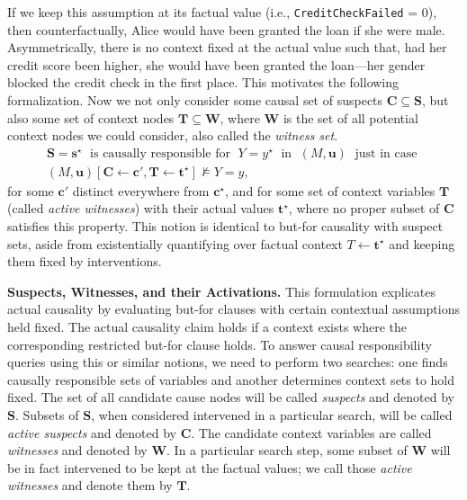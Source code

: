 \documentclass[twoside,11pt]{article}
\renewcommand{\texttt}[1]{\lstinline[basicstyle=\fontsize{8pt}{8.25pt}\selectfont\ttfamily]{#1}}
\begin{document}
If we keep this assumption at its factual value (i.e., \texttt{CreditCheckFailed} = 0), then counterfactually, Alice would have been granted the loan if she were male. Asymmetrically, there is no context fixed at the actual value such that, had her credit score been higher, she would have been granted the loan---her gender blocked the credit check in the first place. This motivates the following formalization. Now we not only consider some causal set of suspects $\mathbf{C} \subseteq \mathbf{S}$, but also some set of context nodes $\mathbf{T} \subseteq \mathbf{W}$, where $\mathbf{W}$ is the set of all potential context nodes we could consider, also called the \emph{witness set}.
\begin{align*}
\mathbf{S} = \mathbf{s}^\star \;\text{ is causally responsible for }\; Y = y^\star \;\text{ in }\; (M, \mathbf{u}) \;\text{ just in case } \\
(M, \mathbf{u})[\mathbf{C} \leftarrow \mathbf{c}', \mathbf{T} \leftarrow \mathbf{t}^\star] \not\models Y = y,
\end{align*}
\noindent for some \(\mathbf{c}'\) distinct everywhere from  \(\mathbf{c}^\star\), and for some set of context variables \(\mathbf{T}\) (called \emph{active witnesses}) with their actual values \(\mathbf{t}^\star\), where no proper subset of \(\mathbf{C}\) satisfies this property. This notion is identical to but-for causality with suspect sets, aside from existentially quantifying over factual context $T \leftarrow \mathbf{t}^\star$ and keeping them fixed by interventions.


\vspace{2mm}
\noindent \textbf{Suspects, Witnesses, and their Activations.} This formulation explicates actual causality by evaluating but-for clauses with certain contextual assumptions held fixed. The actual causality claim holds if a context exists where the corresponding restricted but-for clause holds.   To answer causal responsibility queries using this or similar notions, we need to perform two searches: one finds causally responsible sets of variables and another determines context sets to hold fixed. The set of all candidate cause nodes will be called \emph{suspects} and denoted by $\mathbf{S}$. Subsets of $\mathbf{S}$, when considered intervened in a particular search, will be called \emph{active suspects} and denoted by $\mathbf{C}$. The candidate context variables are called \emph{witnesses} and denoted by $\mathbf{W}$. In a particular search step, some subset of $\mathbf{W}$ will be in fact intervened to be kept at the factual values; we call those \emph{active witnesses} and denote them by $\mathbf{T}$.
\end{document}

